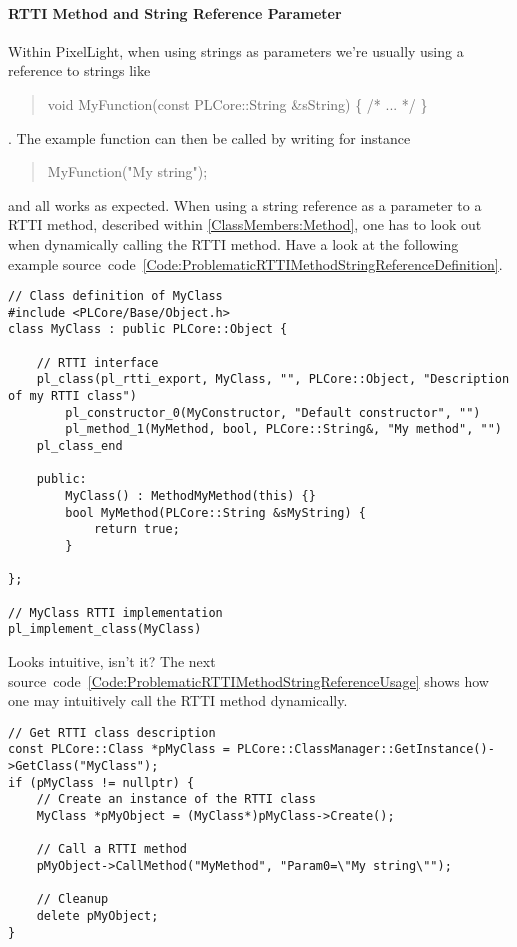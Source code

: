 \paragraph{\ac{RTTI} Method and String Reference Parameter}
\label{Appendix:CommonPitfalls:RTTIMethodStringReferenceParameter}
Within PixelLight, when using strings as parameters we're usually using a reference to strings like \begin{quote}void MyFunction(const PLCore::String \&sString) \{ /* ... */ \}\end{quote}. The example function can then be called by writing for instance \begin{quote}MyFunction("My string");\end{quote} and all works as expected. When using a string reference as a parameter to a \ac{RTTI} method, described within \ref{ClassMembers:Method}, one has to look out when dynamically calling the \ac{RTTI} method. Have a look at the following example source~code~\ref{Code:ProblematicRTTIMethodStringReferenceDefinition}.
\begin{lstlisting}[label=Code:ProblematicRTTIMethodStringReferenceDefinition,caption={Problematic \ac{RTTI} method and string reference parameter definition}]
// Class definition of MyClass
#include <PLCore/Base/Object.h>
class MyClass : public PLCore::Object {

	// RTTI interface
	pl_class(pl_rtti_export, MyClass, "", PLCore::Object, "Description of my RTTI class")
		pl_constructor_0(MyConstructor, "Default constructor", "")
		pl_method_1(MyMethod, bool, PLCore::String&, "My method", "")
	pl_class_end

	public:
		MyClass() : MethodMyMethod(this) {}
		bool MyMethod(PLCore::String &sMyString) {
			return true;
		}

};

// MyClass RTTI implementation
pl_implement_class(MyClass)
\end{lstlisting}
Looks intuitive, isn't it? The next source~code~\ref{Code:ProblematicRTTIMethodStringReferenceUsage} shows how one may intuitively call the \ac{RTTI} method dynamically.
\begin{lstlisting}[label=Code:ProblematicRTTIMethodStringReferenceUsage,caption={Problematic \ac{RTTI} method and string reference parameter usage}]
// Get RTTI class description
const PLCore::Class *pMyClass = PLCore::ClassManager::GetInstance()->GetClass("MyClass");
if (pMyClass != nullptr) {
	// Create an instance of the RTTI class
	MyClass *pMyObject = (MyClass*)pMyClass->Create();

	// Call a RTTI method
	pMyObject->CallMethod("MyMethod", "Param0=\"My string\"");

	// Cleanup
	delete pMyObject;
}
\end{lstlisting}
